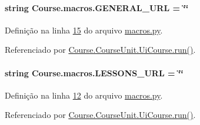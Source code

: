 \paragraph[{G\+E\+N\+E\+R\+A\+L\+\_\+\+U\+R\+L}]{\setlength{\rightskip}{0pt plus 5cm}string Course.\+macros.\+G\+E\+N\+E\+R\+A\+L\+\_\+\+U\+R\+L = \char`\"{}\char`\"{}}\label{namespaceCourse_1_1macros_a9a69c2455c0c121b1c01960629575d7e}


Definição na linha \hyperlink{macros_8py_source_l00015}{15} do arquivo \hyperlink{macros_8py_source}{macros.\+py}.



Referenciado por \hyperlink{classCourse_1_1CourseUnit_1_1UiCourse_aaaf2b8229f2b774f12e719bc0e6f13cb}{Course.\+Course\+Unit.\+Ui\+Course.\+run()}.

\hypertarget{namespaceCourse_1_1macros_a4473a418de016b59cce33b13440e469b}{}
\paragraph[{L\+E\+S\+S\+O\+N\+S\+\_\+\+U\+R\+L}]{\setlength{\rightskip}{0pt plus 5cm}string Course.\+macros.\+L\+E\+S\+S\+O\+N\+S\+\_\+\+U\+R\+L = \char`\"{}\char`\"{}}\label{namespaceCourse_1_1macros_a4473a418de016b59cce33b13440e469b}


Definição na linha \hyperlink{macros_8py_source_l00012}{12} do arquivo \hyperlink{macros_8py_source}{macros.\+py}.



Referenciado por \hyperlink{classCourse_1_1CourseUnit_1_1UiCourse_aaaf2b8229f2b774f12e719bc0e6f13cb}{Course.\+Course\+Unit.\+Ui\+Course.\+run()}.

